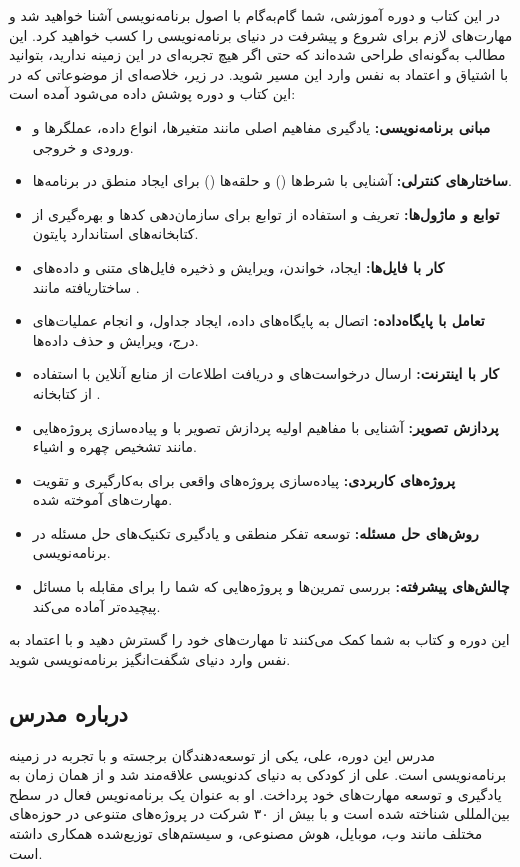 \documentclass[b5paper,12pt]{article}
\begin{document}
	در این کتاب و دوره آموزشی، شما گام‌به‌گام با اصول برنامه‌نویسی آشنا خواهید شد و مهارت‌های لازم برای شروع و پیشرفت در دنیای برنامه‌نویسی را کسب خواهید کرد. این مطالب به‌گونه‌ای طراحی شده‌اند که حتی اگر هیچ تجربه‌ای در این زمینه ندارید، بتوانید با اشتیاق و اعتماد به نفس وارد این مسیر شوید. در زیر، خلاصه‌ای از موضوعاتی که در این کتاب و دوره پوشش داده می‌شود آمده است:
	
	\begin{itemize}
		\item \textbf{مبانی برنامه‌نویسی:} یادگیری مفاهیم اصلی مانند متغیرها، انواع داده، عملگرها و ورودی و خروجی.
		\item \textbf{ساختارهای کنترلی:} آشنایی با شرط‌ها () و حلقه‌ها () برای ایجاد منطق در برنامه‌ها.
		\item \textbf{توابع و ماژول‌ها:} تعریف و استفاده از توابع برای سازمان‌دهی کدها و بهره‌گیری از کتابخانه‌های استاندارد پایتون.
		\item \textbf{کار با فایل‌ها:} ایجاد، خواندن، ویرایش و ذخیره فایل‌های متنی و داده‌های ساختاریافته مانند .
		\item \textbf{تعامل با پایگاه‌داده:} اتصال به پایگاه‌های داده، ایجاد جداول، و انجام عملیات‌های درج، ویرایش و حذف داده‌ها.
		\item \textbf{کار با اینترنت:} ارسال درخواست‌های  و دریافت اطلاعات از منابع آنلاین با استفاده از کتابخانه .
		\item \textbf{پردازش تصویر:} آشنایی با مفاهیم اولیه پردازش تصویر با  و پیاده‌سازی پروژه‌هایی مانند تشخیص چهره و اشیاء.
		\item \textbf{پروژه‌های کاربردی:} پیاده‌سازی پروژه‌های واقعی برای به‌کارگیری و تقویت مهارت‌های آموخته شده.
		\item \textbf{روش‌های حل مسئله:} توسعه تفکر منطقی و یادگیری تکنیک‌های حل مسئله در برنامه‌نویسی.
		\item \textbf{چالش‌های پیشرفته:} بررسی تمرین‌ها و پروژه‌هایی که شما را برای مقابله با مسائل پیچیده‌تر آماده می‌کند.
	\end{itemize}
	
	این دوره و کتاب به شما کمک می‌کنند تا مهارت‌های خود را گسترش دهید و با اعتماد به نفس وارد دنیای شگفت‌انگیز برنامه‌نویسی شوید.
	
	\newpage
	\subsection*{درباره مدرس}
	
	مدرس این دوره، علی، یکی از توسعه‌دهندگان برجسته و با تجربه در زمینه برنامه‌نویسی است. علی از کودکی به دنیای کدنویسی علاقه‌مند شد و از همان زمان به یادگیری و توسعه مهارت‌های خود پرداخت. او به عنوان یک برنامه‌نویس فعال در سطح بین‌المللی شناخته شده است و با بیش از ۳۰ شرکت در پروژه‌های متنوعی در حوزه‌های مختلف مانند وب، موبایل، هوش مصنوعی، و سیستم‌های توزیع‌شده همکاری داشته است.
	
\end{document}
